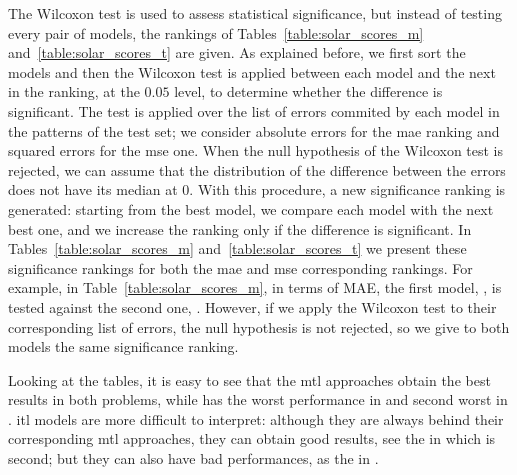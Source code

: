 The Wilcoxon test is used to assess statistical significance, but instead of testing every pair of models, the rankings of Tables~\ref{table:solar_scores_m} and~\ref{table:solar_scores_t} are given. As explained before, we first sort the models and then the Wilcoxon test is applied between each model and the next in the ranking, at the $0.05$ level, to determine whether the difference is significant.
The test is applied over the list of errors commited by each model in the patterns of the test set; we consider absolute errors for the \acrshort{mae} ranking and squared errors for the \acrshort{mse} one. 
%
When the null hypothesis of the Wilcoxon test is rejected, we can assume that the distribution of the difference between the errors does not have its median at $0$.
%
With this procedure, a new significance ranking is generated: starting from the best model, we compare each model with the next best one, and we increase the ranking only if the difference is significant. In Tables~\ref{table:solar_scores_m} and~\ref{table:solar_scores_t} we present these significance rankings for both the \acrshort{mae} and \acrshort{mse} corresponding rankings.
%
For example, in Table~\ref{table:solar_scores_m}, in terms of MAE, the first model, , is tested against the second one, . 
However, if we apply the Wilcoxon test to their corresponding list of errors, the null hypothesis is not rejected, so we give to both models the same significance ranking.

%
Looking at the tables, it is easy to see that the \acrshort{mtl} approaches obtain the best results in both problems, while  has the worst performance in  and second worst in .
\acrshort{itl} models are more difficult to interpret: although they are always behind their corresponding \acrshort{mtl} approaches, they can obtain good results, see the  in  which is second; but they can also have bad performances, as the  in .

